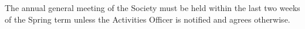 \begin{clause}
  The annual general meeting of the Society must be held within the last two weeks of the Spring term unless the Activities Officer is notified and agrees otherwise.
\end{clause}
